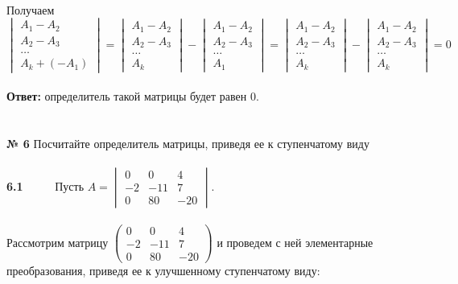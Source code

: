 \documentclass[a4paper, 12pt]{article}
\begin{document}
    \\ Получаем $\begin{vmatrix}A_1 - A_2 \\ A_2 - A_3 \\ \dots \\ A_k + (-A_1)\end{vmatrix} = \begin{vmatrix}A_1 - A_2 \\ A_2 - A_3 \\ \dots \\ A_k\end{vmatrix} - \begin{vmatrix}A_1 - A_2 \\ A_2 - A_3 \\ \dots \\ A_1\end{vmatrix} = \begin{vmatrix}A_1 - A_2 \\ A_2 - A_3 \\ \dots \\ A_k\end{vmatrix} - \begin{vmatrix}A_1 - A_2 \\ A_2 - A_3 \\ \dots \\ A_k\end{vmatrix} = 0$
    \\
    \\ \textbf{Ответ: } определитель такой матрицы будет равен 0.
    \\
    \\
    \\ \textbf{№ 6} Посчитайте определитель матрицы, приведя ее к ступенчатому виду
    \\
    \\ \textbf{6.1}  \ \ \ \ \ Пусть $A = \begin{vmatrix}0 & 0 & 4 \\ -2 & -11 & 7 \\ 0 & 80 & -20\end{vmatrix}$.
    \\
    \\ Рассмотрим матрицу $\begin{pmatrix}0 & 0 & 4 \\ -2 & -11 & 7 \\ 0 & 80 & -20\end{pmatrix}$ и проведем с ней элементарные преобразования, приведя ее к улучшенному ступенчатому виду:
    \\
\end{document}

